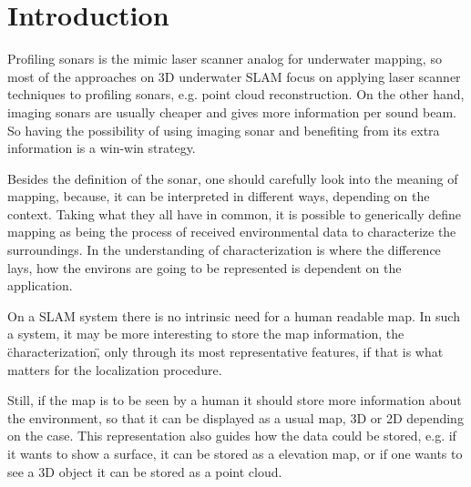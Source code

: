 \chapter{Introduction}
Profiling sonars is the mimic laser scanner analog for underwater mapping,
so most of the approaches on 3D underwater SLAM focus on applying laser scanner
techniques to profiling sonars, e.g. point cloud reconstruction. On the other
hand, imaging sonars are usually cheaper and gives more information per sound
beam. So having the possibility of using imaging sonar and benefiting from its
extra information is a win-win strategy.

Besides the definition of the sonar, one should carefully look into the meaning
of mapping, because, it can be interpreted in different ways, depending on the
context.
Taking what they all have in common, it is possible to generically define
mapping as being the process of received environmental data to characterize
the surroundings. In the understanding of characterization is where the
difference lays, how the environs are going to be represented is dependent on
the application.

On a SLAM system there is no intrinsic need for a human readable map. In such a
system, it may be more interesting to store the map information, the
\"characterization\", only through its most representative features, if that is
what matters for the localization procedure.

Still, if the map is to be seen by a human it should store more information
about the environment, so that it can be displayed as a usual map, 3D or 2D
depending on the case. This representation also guides how the data could be
stored, e.g. if it wants to show a surface, it can be stored as a elevation map,
or if one wants to see a 3D object it can be stored as a point cloud.





